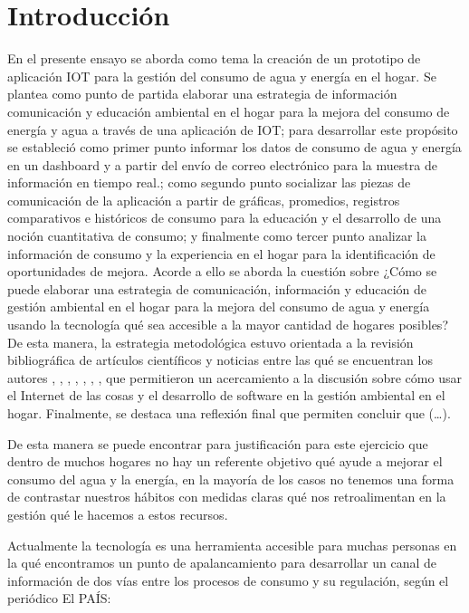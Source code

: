 \documentclass[a4paper,man,natbib]{apa6}
\begin{document}


\section{Introducción}
En el presente ensayo se aborda como tema la creación de un prototipo de aplicación IOT para la gestión del consumo de agua y energía en el hogar. Se plantea como punto de partida elaborar una estrategia de información comunicación y educación ambiental en el hogar para la mejora del consumo de energía y agua a través de una aplicación de IOT; para desarrollar este propósito se estableció como primer punto informar los datos de consumo de agua y energía en un dashboard y a partir del envío de correo electrónico para la muestra de información en tiempo real.; como segundo punto socializar las piezas de comunicación de la aplicación a partir de gráficas, promedios, registros comparativos e históricos de consumo para la educación y el desarrollo de una noción cuantitativa de consumo; y finalmente como tercer punto analizar la información de consumo y la experiencia en el hogar para la identificación de oportunidades de mejora. Acorde a ello se aborda la cuestión sobre ¿Cómo se puede elaborar una estrategia de comunicación, información y educación de gestión ambiental en el hogar para la mejora del consumo de agua y energía usando la tecnología qué sea accesible a la mayor cantidad de hogares posibles? De esta manera, la estrategia metodológica estuvo orientada a la revisión bibliográfica de artículos científicos y noticias entre las qué se encuentran los autores \citep{7398710}, \citep{8612412}, \citep{Aguaenel98:online}, \citep{Ahorrode59:online}, \citep{Betancourt20201}, \citep{Diadeagu32:online}, \citep{Enterate82:online}, \citep{Milesdem41:online} que permitieron un acercamiento a la discusión sobre cómo usar el Internet de las cosas y el desarrollo de software en la gestión ambiental en el hogar. Finalmente, se destaca una reflexión final que permiten concluir que (…).\newline

De esta manera se puede encontrar para justificación para este ejercicio que dentro de muchos hogares no hay un referente objetivo qué ayude a mejorar el consumo del agua y la energía, en la mayoría de los casos no tenemos una forma de contrastar nuestros hábitos con medidas claras qué nos retroalimentan en la gestión qué le hacemos a estos recursos.\newline

Actualmente la tecnología es una herramienta accesible para muchas personas en la qué encontramos un punto de apalancamiento para desarrollar un canal de información de dos vías entre los procesos de consumo y su regulación, según el periódico El PAÍS:\newline
\end{document}
